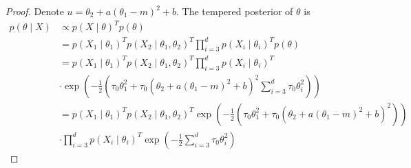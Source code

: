 \documentclass[english,twoside,openright]{HYgraduMLDS}
\begin{document}
\begin{appendices}
\begin{proof}
    Denote \(u = \theta_2 + a(\theta_1 - m)^2 + b\).
    The tempered posterior of \(\theta\) is
    \begin{align*}
        p(\theta\mid X) &\propto p(X\mid \theta)^Tp(\theta)
        \\&= p(X_1\mid \theta_1)^Tp(X_2\mid \theta_1, \theta_2)^T
        \prod_{i=3}^d p(X_i\mid \theta_i)^T p(\theta)
        \\&= p(X_1\mid \theta_1)^Tp(X_2\mid \theta_1, \theta_2)^T
        \prod_{i=3}^d p(X_i\mid \theta_i)^T
        \\&\cdot \exp\left(-\frac{1}{2}\left(\tau_0\theta_1^2
        + \tau_0(\theta_2 + a(\theta_1 - m)^2 + b)^2
        \sum_{i=3}^d \tau_0\theta_i^2\right)\right)
        \\&= p(X_1\mid \theta_1)^Tp(X_2\mid \theta_1, \theta_2)^T
        \exp\left(-\frac{1}{2}\left(\tau_0\theta_1^2
        + \tau_0(\theta_2 + a(\theta_1 - m)^2 + b)^2\right)\right)
        \\&\cdot \prod_{i=3}^d p(X_i\mid \theta_i)^T
        \exp\left(-\frac{1}{2}\sum_{i=3}^d \tau_0\theta_i^2\right)
    \end{align*}


\end{proof}
\end{appendices}
\end{document}
